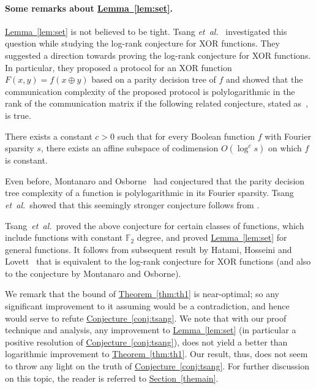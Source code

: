 \documentclass{toc}
\newcommand{\etal}{{\it et~al.}}
\newcommand{\lref}[2][]{\hyperref[#2]{#1~\ref*{#2}}}
\begin{document}
\paragraph{Some remarks about \lref[Lemma]{lem:set}.}
%
\lref[Lemma]{lem:set} is not believed to be tight. 
Tsang \etal~\cite{tsang} investigated this question while studying
the log-rank conjecture for XOR functions. They suggested a direction towards proving
the log-rank conjecture for XOR
functions. In particular,
%
they  %
proposed a protocol for
an XOR function $F(x,y)=f(x \oplus y)$ based on a parity decision tree of $f$ and showed that the
communication complexity of the proposed protocol is polylogarithmic
in the rank of the communication matrix if the following related
%
%
conjecture, stated as~\cite[Conjecture~27]{tsang}, 
is true.
\begin{conjecture}    %
 \label{conj:tsang}
 There exists a constant $c > 0$ such that for every Boolean function
 $f$ with Fourier sparsity $s$, there exists an affine subspace of
 codimension $O\left(\log^c s\right)$ on which $f$ is constant.
\end{conjecture} 
Even before, Montanaro and Osborne~\cite{DBLP:journals/corr/abs-0909-3392} had conjectured that the parity decision tree complexity of a function is polylogarithmic in its Fourier sparsity. Tsang \etal\ showed that this seemingly stronger conjecture follows from .

Tsang~\etal~proved the above conjecture for certain classes of
functions, which include functions with constant $\mathbb{F}_2$
degree, and proved \lref[Lemma]{lem:set} for general functions. It follows from %
subsequent %
result by Hatami, Hosseini and Lovett~\cite{DBLP:conf/focs/HatamiHL16}
that  is equivalent to the log-rank conjecture for XOR functions (and also to the conjecture by Montanaro and Osborne).


We remark that the bound of \lref[Theorem]{thm:th1} is near-optimal; so any significant improvement to it assuming  would be a contradiction, and hence would serve to refute \lref[Conjecture]{conj:tsang}. We note that with our proof technique and analysis, any improvement
to \lref[Lemma]{lem:set} (in particular a positive resolution of
\lref[Conjecture]{conj:tsang}), does not yield a better than
logarithmic improvement to \lref[Theorem]{thm:th1}. Our result, thus, does not seem to throw any light on the truth of \lref[Conjecture]{conj:tsang}. For further
discussion on this topic, the reader is referred to \lref[Section]{themain}.
\end{document}
